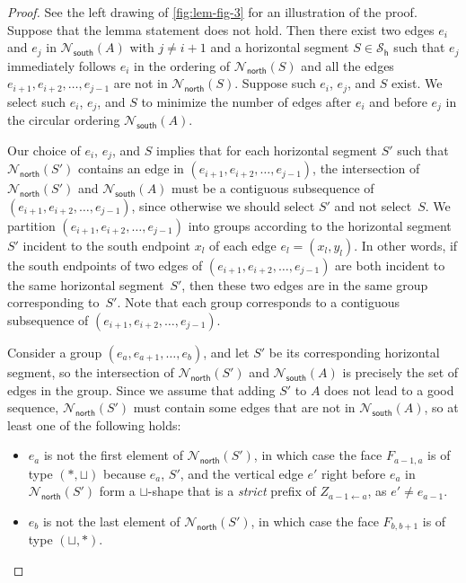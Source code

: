 \documentclass{theoretics}
\newcommand{\PH}{\mathcal{S}_\mathsf{h}}
\newcommand{\Nnorth}{\mathcal{N}_\mathsf{north}}
\newcommand{\Nsouth}{\mathcal{N}_\mathsf{south}}
\begin{document}
\begin{proof}
See the left drawing of \cref{fig:lem-fig-3} for an illustration of the proof.  
 Suppose that the lemma statement does not hold. Then there exist two edges $e_i$ and $e_j$ in $\Nsouth(A)$ with $j \neq i+1$ and a horizontal segment $S \in \PH$ such that $e_j$ immediately follows $e_i$ in the ordering of $\Nnorth(S)$ and all the edges $e_{i+1}, e_{i+2}, \ldots, e_{j-1}$ are not in $\Nnorth(S)$. 
 Suppose such $e_i$, $e_j$, and $S$ exist. We select such $e_i$, $e_j$, and $S$ to minimize the number of edges after $e_i$ and before $e_j$ in the circular ordering $\Nsouth(A)$.
 
 Our choice of $e_i$, $e_j$, and $S$ implies that for each horizontal segment $S'$ such that $\Nnorth(S')$ contains an edge in $(e_{i+1}, e_{i+2}, \ldots, e_{j-1})$, the intersection of $\Nnorth(S')$ and $\Nsouth(A)$ must be a contiguous subsequence of $(e_{i+1}, e_{i+2}, \ldots, e_{j-1})$, since otherwise we should select $S'$ and not select~$S$. We  partition $(e_{i+1}, e_{i+2}, \ldots, e_{j-1})$ into groups according to the horizontal segment~$S'$ incident to the south endpoint $x_l$ of each edge $e_l=(x_l, y_l)$. In other words, if the south endpoints of two edges of $(e_{i+1}, e_{i+2}, \ldots, e_{j-1})$ are both incident to the same horizontal segment~$S'$, then these two edges are in the same group corresponding to~$S'$.
 Note that each group corresponds to a contiguous subsequence of $(e_{i+1}, e_{i+2}, \ldots, e_{j-1})$. 
 
 Consider a group $(e_a, e_{a+1}, \ldots, e_b)$, and let $S'$ be its corresponding horizontal segment, so the intersection of $\Nnorth(S')$ and $\Nsouth(A)$ is precisely the set of edges in the group. Since we assume that adding $S'$ to $A$ does not lead to a good sequence, $\Nnorth(S')$ must contain some edges that are not in $\Nsouth(A)$, so at least one of the following holds:
 \begin{itemize}
     \item $e_a$ is not the first element of  $\Nnorth(S')$, in which case the face $F_{a-1,a}$ is of type $(\ast,\sqcup)$ because $e_a$, $S'$, and the vertical edge $e'$ right before $e_a$ in $\Nnorth(S')$ form a $\sqcup$-shape that is a \emph{strict} prefix of $Z_{a-1 \leftarrow a}$, as $e' \neq e_{a-1}$.
     \item $e_b$ is not the last element of $\Nnorth(S')$, in which case the face $F_{b,b+1}$ is of type $(\sqcup,\ast)$.
 \end{itemize}
 

\end{proof}
\end{document}
